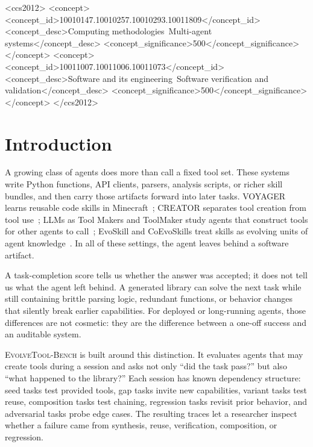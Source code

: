 \documentclass[sigconf,anonymous,review,natbib=false]{acmart}
\begin{document}
\begin{CCSXML}
<ccs2012>
 <concept>
  <concept_id>10010147.10010257.10010293.10011809</concept_id>
  <concept_desc>Computing methodologies~Multi-agent systems</concept_desc>
  <concept_significance>500</concept_significance>
 </concept>
 <concept>
  <concept_id>10011007.10011006.10011073</concept_id>
  <concept_desc>Software and its engineering~Software verification and validation</concept_desc>
  <concept_significance>500</concept_significance>
 </concept>
</ccs2012>
\end{CCSXML}

\maketitle

\section{Introduction}

A growing class of agents does more than call a fixed tool set. These systems write Python functions, API clients, parsers, analysis scripts, or richer skill bundles, and then carry those artifacts forward into later tasks. VOYAGER learns reusable code skills in Minecraft~\cite{wang2023voyager}; CREATOR separates tool creation from tool use~\cite{qian2023creator}; LLMs as Tool Makers and ToolMaker study agents that construct tools for other agents to call~\cite{cai2023latm,wolflein2025toolmaker}; EvoSkill and CoEvoSkills treat skills as evolving units of agent knowledge~\cite{alzubi2026evoskill,zhang2026coevoskills}. In all of these settings, the agent leaves behind a software artifact.

A task-completion score tells us whether the answer was accepted; it does not tell us what the agent left behind. A generated library can solve the next task while still containing brittle parsing logic, redundant functions, or behavior changes that silently break earlier capabilities. For deployed or long-running agents, those differences are not cosmetic: they are the difference between a one-off success and an auditable system.

\textsc{EvolveTool-Bench} is built around this distinction. It evaluates agents that may create tools during a session and asks not only ``did the task pass?'' but also ``what happened to the library?'' Each session has known dependency structure: seed tasks test provided tools, gap tasks invite new capabilities, variant tasks test reuse, composition tasks test chaining, regression tasks revisit prior behavior, and adversarial tasks probe edge cases. The resulting traces let a researcher inspect whether a failure came from synthesis, reuse, verification, composition, or regression.
\end{document}
